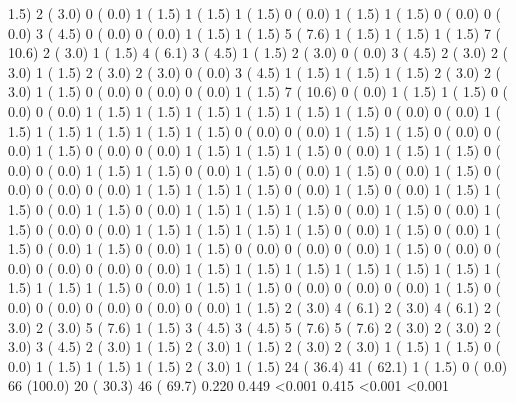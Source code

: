 1.5)   2 (  3.0)   0 (  0.0)   1 (  1.5)   1 (  1.5)   1 (  1.5)   0 (  0.0)   1 (  1.5)   1 (  1.5)   0 (  0.0)   0 (  0.0)   3 (  4.5)   0 (  0.0)   0 (  0.0)   1 (  1.5)   1 (  1.5)   5 (  7.6)   1 (  1.5)   1 (  1.5)   1 (  1.5)   7 ( 10.6)   2 (  3.0)   1 (  1.5)   4 (  6.1)   3 (  4.5)   1 (  1.5)   2 (  3.0)   0 (  0.0)   3 (  4.5)   2 (  3.0)   2 (  3.0)   1 (  1.5)   2 (  3.0)   2 (  3.0)   0 (  0.0)   3 (  4.5)   1 (  1.5)   1 (  1.5)   1 (  1.5)   2 (  3.0)   2 (  3.0)   1 (  1.5)   0 (  0.0)   0 (  0.0)   0 (  0.0)   1 (  1.5)   7 ( 10.6)   0 (  0.0)   1 (  1.5)   1 (  1.5)   0 (  0.0)   0 (  0.0)   1 (  1.5)   1 (  1.5)   1 (  1.5)   1 (  1.5)   1 (  1.5)   1 (  1.5)   0 (  0.0)   0 (  0.0)   1 (  1.5)   1 (  1.5)   1 (  1.5)   1 (  1.5)   1 (  1.5)   0 (  0.0)   0 (  0.0)   1 (  1.5)   1 (  1.5)   0 (  0.0)   0 (  0.0)   1 (  1.5)   0 (  0.0)   0 (  0.0)   1 (  1.5)   1 (  1.5)   1 (  1.5)   0 (  0.0)   1 (  1.5)   1 (  1.5)   0 (  0.0)   0 (  0.0)   1 (  1.5)   1 (  1.5)   0 (  0.0)   1 (  1.5)   0 (  0.0)   1 (  1.5)   0 (  0.0)   1 (  1.5)   0 (  0.0)   0 (  0.0)   0 (  0.0)   1 (  1.5)   1 (  1.5)   1 (  1.5)   0 (  0.0)   1 (  1.5)   0 (  0.0)   1 (  1.5)   1 (  1.5)   0 (  0.0)   1 (  1.5)   0 (  0.0)   1 (  1.5)   1 (  1.5)   1 (  1.5)   0 (  0.0)   1 (  1.5)   0 (  0.0)   1 (  1.5)   0 (  0.0)   0 (  0.0)   1 (  1.5)   1 (  1.5)   1 (  1.5)   1 (  1.5)   0 (  0.0)   1 (  1.5)   0 (  0.0)   1 (  1.5)   0 (  0.0)   1 (  1.5)   0 (  0.0)   1 (  1.5)   0 (  0.0)   0 (  0.0)   0 (  0.0)   1 (  1.5)   0 (  0.0)   0 (  0.0)   0 (  0.0)   0 (  0.0)   0 (  0.0)   1 (  1.5)   1 (  1.5)   1 (  1.5)   1 (  1.5)   1 (  1.5)   1 (  1.5)   1 (  1.5)   1 (  1.5)   1 (  1.5)   0 (  0.0)   1 (  1.5)   1 (  1.5)   0 (  0.0)   0 (  0.0)   0 (  0.0)   1 (  1.5)   0 (  0.0)   0 (  0.0)   0 (  0.0)   0 (  0.0)   0 (  0.0)   1 (  1.5)   2 (  3.0)   4 (  6.1)   2 (  3.0)   4 (  6.1)   2 (  3.0)   2 (  3.0)   5 (  7.6)   1 (  1.5)   3 (  4.5)   3 (  4.5)   5 (  7.6)   5 (  7.6)   2 (  3.0)   2 (  3.0)   2 (  3.0)   3 (  4.5)   2 (  3.0)   1 (  1.5)   2 (  3.0)   1 (  1.5)   2 (  3.0)   2 (  3.0)   1 (  1.5)   1 (  1.5)   0 (  0.0)   1 (  1.5)   1 (  1.5)   1 (  1.5)   2 (  3.0)   1 (  1.5)  24 ( 36.4)  41 ( 62.1)   1 (  1.5)   0 (  0.0)  66 (100.0)  20 ( 30.3)  46 ( 69.7)    0.220                                                         0.449                                                                                                            <0.001                                 0.415   <0.001  <0.001                                                                                                                                                                                                             